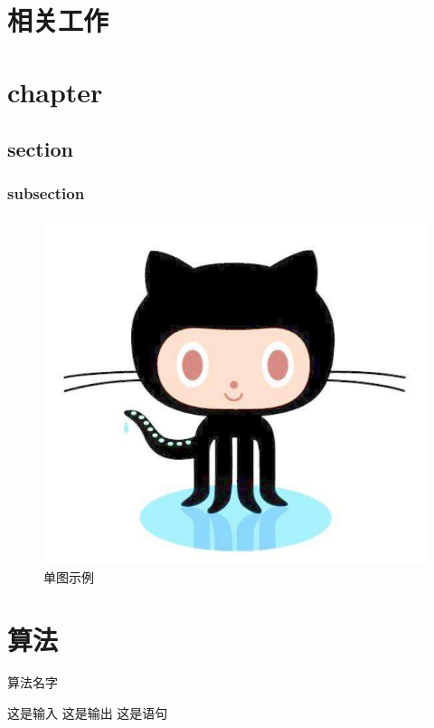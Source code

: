 \documentclass[winfonts,phd,twoside]{njuthesis}
\begin{document}
\chapter{相关工作}

\lipsum[1]

\chapter{chapter}

\lipsum[1]

\section{section}\label{sec:rate}
\lipsum[1]
\subsection{subsection}
\lipsum[1]

\begin{figure}[htbp]
  \centering
  \includegraphics[width=0.6\linewidth]{./figure/github.jpg}
  \caption{单图示例}
  \label{fig:system}
\end{figure}

\chapter{算法}

\begin{algorithm}[htbp]
  \caption{算法名字}
  \label{alg:alg1}
  \begin{algorithmic}[1]
        \REQUIRE 这是输入
        \ENSURE 这是输出
		      \STATE 这是语句
        \ENDWHILE
  \end{algorithmic}
\end{algorithm}
\end{document}
